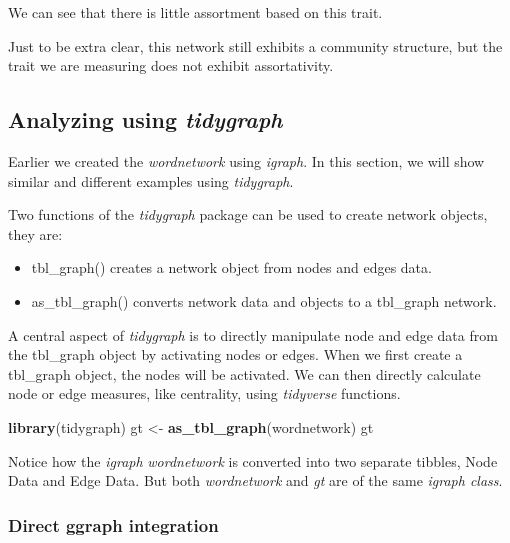 \documentclass[
]{article}
\newenvironment{Shaded}{\begin{snugshade}}{\end{snugshade}}
\newcommand{\FunctionTok}[1]{\textcolor[rgb]{0.13,0.29,0.53}{\textbf{#1}}}
\newcommand{\NormalTok}[1]{#1}
\newcommand{\OtherTok}[1]{\textcolor[rgb]{0.56,0.35,0.01}{#1}}
\providecommand{\tightlist}{%
  \setlength{\itemsep}{0pt}\setlength{\parskip}{0pt}}
\begin{document}
We can see that there is little assortment based on this trait.

Just to be extra clear, this network still exhibits a community structure, but the trait we are measuring does not exhibit assortativity.

\hypertarget{analyzing-using-tidygraph}{%
\subsection{\texorpdfstring{Analyzing using \emph{tidygraph}}{Analyzing using tidygraph}}\label{analyzing-using-tidygraph}}

Earlier we created the \emph{wordnetwork} using \emph{igraph}. In this section, we will show similar and different examples using \emph{tidygraph}.

Two functions of the \emph{tidygraph} package can be used to create network objects, they are:

\begin{itemize}
\tightlist
\item
  tbl\_graph() creates a network object from nodes and edges data.
\item
  as\_tbl\_graph() converts network data and objects to a tbl\_graph network.
\end{itemize}

A central aspect of \emph{tidygraph} is to directly manipulate node and edge data from the tbl\_graph object by activating nodes or edges. When we first create a tbl\_graph object, the nodes will be activated. We can then directly calculate node or edge measures, like centrality, using \emph{tidyverse} functions.

\footnotesize

\begin{Shaded}
\begin{Highlighting}[]
\FunctionTok{library}\NormalTok{(tidygraph)}
\NormalTok{gt }\OtherTok{\textless{}{-}} \FunctionTok{as\_tbl\_graph}\NormalTok{(wordnetwork)}
\NormalTok{gt}
\end{Highlighting}
\end{Shaded}

\normalsize

Notice how the \emph{igraph} \emph{wordnetwork} is converted into two separate tibbles, Node Data and Edge Data. But both \emph{wordnetwork} and \emph{gt} are of the same \emph{igraph class}.

\hypertarget{direct-ggraph-integration}{%
\subsubsection{Direct ggraph integration}\label{direct-ggraph-integration}}
\end{document}
